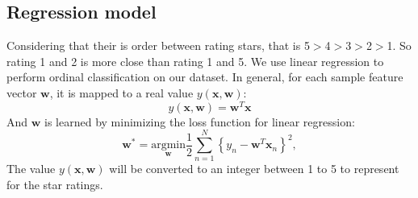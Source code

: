 \subsection{Regression model}
Considering that their is order between rating stars, that is 5$>$4$>$3$>$2$>$1. So rating 1 and 2 is more close than rating 1 and 5. We use linear regression to perform ordinal classification on our dataset.  In general, for each sample feature vector $\textbf{w}$, it is mapped to a real value $y(\textbf{x},\textbf{w})$:\\
\begin{equation}
y(\textbf{x},\textbf{w})=\textbf{w}^T\textbf{x}
\end{equation}
And $\textbf{w}$ is learned by minimizing the loss function for linear regression:\\
\begin{equation}
\textbf{w}^* = \underset{\textbf{w}}{\mathrm{arg min}}\frac{1}{2}\sum_{n=1}^N\left\{y_n-\textbf{w}^T\textbf{x}_n\right\}^2,
\end{equation}
The value $y(\textbf{x},\textbf{w})$ will be converted to an integer between 1 to 5 to represent for the star ratings.

































